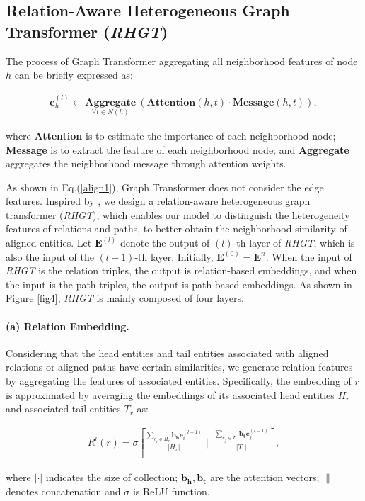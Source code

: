 \documentclass{article}
\begin{document}
\subsection{Relation-Aware Heterogeneous Graph Transformer (\textit{RHGT})}
The process of Graph Transformer \cite{yun_graph_2019} aggregating all neighborhood features of node $h$ can be briefly expressed as:
\begin{small} 
	\begin{align}
	\label{align1}
	\mathbf{e}^{(l)}_{h} \leftarrow 
	\underset{\forall t\in N(h)}{\mathbf{Aggregate}}\ (\mathbf{Attention}(h, t) \cdot \mathbf{Message}(h, t)),
	\end{align}
\end{small}where
\textbf{Attention} is to estimate the importance of each neighborhood node;
\textbf{Message} is to extract the feature of each neighborhood node;
and \textbf{Aggregate} aggregates the neighborhood message through attention weights.

As shown in Eq.(\ref{align1}), Graph Transformer does not consider the edge features.
Inspired by \cite{hu_heterogeneous_2020}, we design a relation-aware heterogeneous graph transformer (\textit{RHGT}), which enables our model to distinguish the heterogeneity features of relations and paths, to better obtain the neighborhood similarity of aligned entities.
Let $\mathbf{E}^{(l)}$ denote the output of $(l)$-th layer of \textit{RHGT}, which is also the input of the $(l+1)$-th layer.
Initially, $\mathbf{E}^{(0)} = {\mathbf {E}}^{n}$. 
When the input of \textit{RHGT} is the relation triples, the output is relation-based embeddings, and when the input is the path triples, the output is path-based embeddings.
As shown in Figure \ref{fig4}, \textit{RHGT} is mainly composed of four layers.


\paragraph{(a) Relation Embedding.}
Considering that the head entities and tail entities associated with aligned relations or aligned paths have certain similarities, we generate relation features by aggregating the features of associated entities.
Specifically, the embedding of $r$ is approximated by averaging the embeddings of its associated head entities $H_r$ and associated tail entities $T_r$ as: 
\begin{small}
	\begin{align}
	\label{align2}
	R^{l}(r) =\sigma \left[
	\frac{\sum_{e_i \in H_{r}} \mathbf{b_h} \mathbf{e}^{(l-1)}_{i}}{\left|H_{r}\right|}
	\| 
	\frac{\sum_{e_j \in T_{r}} \mathbf{b_t} \mathbf{e}^{(l-1)}_{j}}{\left|T_{r}\right|}
	\right],
	\end{align}
\end{small}where
$|\cdot|$ indicates the size of collection;
$\mathbf{b_h}, \mathbf{b_t}$ are the attention vectors;
$\| $ denotes concatenation and $\sigma $ is ReLU function.
\end{document}
